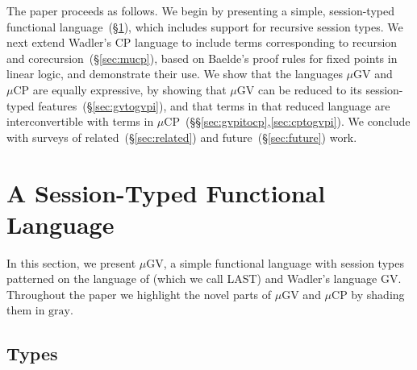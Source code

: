 \documentclass[orivec,envcountsame]{llncs}
\newcommand{\mucp}{$\mu\mathrm{CP}$\xspace}
\newcommand{\mugv}{$\mu\mathrm{GV}$\xspace}
\newcommand{\secref}[1]{(\S\ref{sec:#1})}
\newcommand\shade[1]{\setlength{\fboxsep}{0pt}\colorbox{shade}{\ensuremath{#1}}}
\newcommand{\todo}[1]{{\noindent\small\color{red} \framebox{\parbox{\dimexpr\linewidth-2\fboxsep-2\fboxrule}{\textbf{TODO:} #1}}}}
\begin{document}
The paper proceeds as follows. We begin by presenting a simple, session-typed functional
language~\secref{mugv}, which includes support for recursive session types.  We next extend Wadler's
CP language to include terms corresponding to recursion and corecursion~\secref{mucp}, based on
Baelde's proof rules for fixed points in linear logic, and demonstrate their use.  We show that the
languages \mugv and \mucp are equally expressive, by showing that \mugv can be reduced to its
session-typed features~\secref{gvtogvpi}, and that terms in that reduced language are
interconvertible with terms in \mucp~(\S\S\ref{sec:gvpitocp},\ref{sec:cptogvpi}).  We conclude with
surveys of related~\secref{related} and future~\secref{future} work.


\section{A Session-Typed Functional Language}
\label{sec:mugv}

In this section, we present \mugv, a simple functional language with session types patterned on the
language of \citet{GayVasconcelos10} (which we call LAST) and Wadler's language GV.
%
Throughout the paper we highlight the novel parts of \mugv and \mucp by shading them in
\shade{\mathrm{gray}}.

\subsection{Types}
\label{sec:mugv-types}
\end{document}
